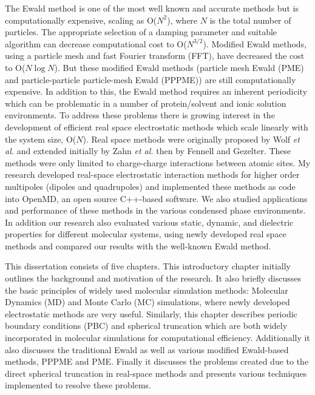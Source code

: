 The Ewald method is one of the most well known and accurate methods but is computationally expensive, scaling as O($N^2$), where $N$ is the total number of particles. The appropriate selection of a damping parameter and suitable algorithm can decrease computational cost to O($N^{3/2}$).\cite{Perram88} Modified Ewald methods, using a particle mesh and fast Fourier transform (FFT), have decreased the cost to O($N\log N$). \cite{Shimada93, Luty95, Darden93,Essmann95} But these modified Ewald methods (particle mesh Ewald (PME) and particle-particle particle-mesh Ewald (PPPME)) are still computationally expensive. In addition to this, the Ewald method requires an inherent periodicity which can be problematic in a number of protein/solvent and ionic solution environments. \cite{Roberts94,Roberts95,Luty96,Hunenberger99a,Hunenberger99b,Weber00,Gezelter06} To address these problems there is growing interest in the development of efficient real space electrostatic methods which scale linearly with the system size, O($N$). Real space methods were originally proposed by Wolf \textit{et al.} \cite{Wolf99} and extended initially by Zahn \textit{et al.}\cite{Zahn02} then by Fennell and Gezelter. \cite{Gezelter06} These methods were only limited to charge-charge interactions between atomic sites. My research developed real-space electrostatic interaction methods for higher order multipoles (dipoles and quadrupoles) and implemented these methods as code into OpenMD, \cite{openmd} an open source C++-based software. We also studied applications and performance of these methods in the various condensed phase environments. In addition our research also evaluated various static, dynamic, and dielectric properties for different molecular systems, using newly developed real space methods and compared our results with the well-known Ewald method. 

%

This dissertation consists of five chapters. This introductory chapter initially outlines the background and motivation of the research. It also briefly  discusses the basic principles of widely used molecular simulation methods: Molecular Dynamics (MD) and Monte Carlo (MC) simulations, where newly developed electrostatic methods are very useful. Similarly, this chapter describes periodic boundary conditions (PBC) and spherical truncation which are both widely incorporated in molecular simulations for computational efficiency. Additionally it also discusses the traditional Ewald as well as various modified Ewald-based methods, PPPME and PME. Finally it discusses the problems created due to the direct spherical truncation in real-space methods and presents various techniques implemented to resolve these problems.

